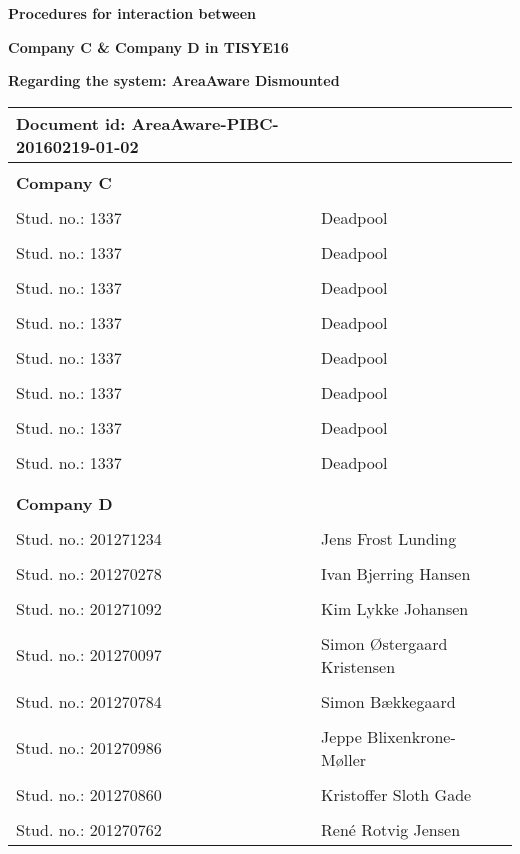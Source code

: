 
\centerline{\Huge\bfseries\color{ThemeColor} Procedures for interaction between}
\vspace{0.5cm} 
\centerline{\Huge\bfseries\color{ThemeColor} Company C \& Company D in TISYE16} 


\vspace{1em}
\centerline{\Large\bfseries\color{BlackColor} Regarding the system: AreaAware Dismounted} 


\begin{center}
   \begin{tabular}{ l l l}
   \textbf{Document id: AreaAware-PIBC-20160219-01-02} && \\
   \hline
   & & \\
   \textbf{Company C} &  & \\
   & & \\
   Stud. no.: 1337 & Deadpool & \\\hline
   & & \\
   Stud. no.: 1337 & Deadpool & \\\hline
   & & \\
   Stud. no.: 1337 & Deadpool & \\\hline
   & & \\
   Stud. no.: 1337 & Deadpool & \\\hline
   & & \\
   Stud. no.: 1337 & Deadpool & \\\hline
   & & \\
   Stud. no.: 1337 & Deadpool & \\\hline
   & & \\
   Stud. no.: 1337 & Deadpool & \\\hline
   & & \\
   Stud. no.: 1337 & Deadpool & \\\hline
   & & \\
   & & \\
   \textbf{Company D} &  & \\
   & & \\
   Stud. no.: 201271234 & Jens Frost Lunding & \\\hline
   & & \\
   Stud. no.: 201270278 & Ivan Bjerring Hansen & \\\hline
   & & \\
   Stud. no.: 201271092 & Kim Lykke Johansen & \\\hline
   & & \\
   Stud. no.: 201270097 & Simon Østergaard Kristensen & \\\hline
   & & \\
   Stud. no.: 201270784  & Simon Bækkegaard & \\\hline
   & & \\
   Stud. no.: 201270986 & Jeppe Blixenkrone-Møller & \\\hline
   & & \\
   Stud. no.: 201270860 & Kristoffer Sloth Gade & \\\hline
   & & \\
   Stud. no.: 201270762 & René Rotvig Jensen & \\\hline
   \end{tabular}
\end{center}
\thispagestyle{empty} %
\restoregeometry
